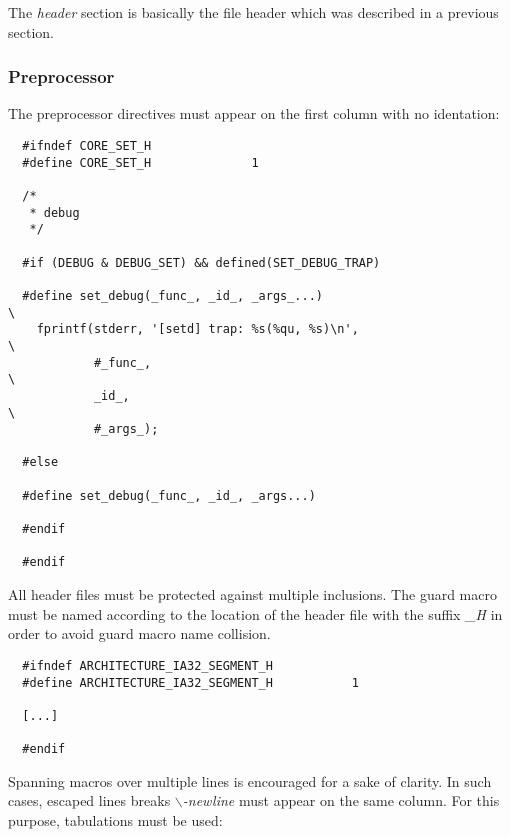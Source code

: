 The \textit{header} section is basically the file header which was described
in a previous section.


\subsubsection{Preprocessor}

The preprocessor directives must appear on the first column with no
identation:

\begin{verbatim}
  #ifndef CORE_SET_H
  #define CORE_SET_H              1

  /*
   * debug
   */

  #if (DEBUG & DEBUG_SET) && defined(SET_DEBUG_TRAP)

  #define set_debug(_func_, _id_, _args_...)                              \
    fprintf(stderr, '[setd] trap: %s(%qu, %s)\n',                         \
            #_func_,                                                      \
            _id_,                                                         \
            #_args_);

  #else

  #define set_debug(_func_, _id_, _args...)

  #endif

  #endif
\end{verbatim}

All header files must be protected against multiple inclusions. The
guard macro must be named according to the location of the header file
with the suffix \textit{\_H} in order to avoid guard macro name collision.

\begin{verbatim}
  #ifndef ARCHITECTURE_IA32_SEGMENT_H
  #define ARCHITECTURE_IA32_SEGMENT_H           1

  [...]

  #endif
\end{verbatim}

Spanning macros over multiple lines is encouraged for a sake of clarity. In
such cases, escaped lines breaks \textit{$\backslash$-newline} must appear
on the same column. For this purpose, tabulations must be used:

